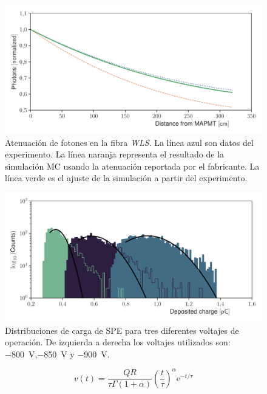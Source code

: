 \begin{figure}
        \centering
        \includegraphics[width=\textwidth]{data_atlength.pdf}
        \caption{Atenuación de fotones en la fibra \emph{WLS}. La línea azul son datos del experimento. La línea naranja representa el resultado de la simulación MC usando la atenuación reportada por el fabricante. La línea verde es el ajuste de la simulación a partir del experimento.}
        \label{fig:atlength}
\end{figure}



\begin{figure}
        \centering
        \includegraphics[width=\textwidth]{mapmt_charge.pdf}
        \caption{Distribuciones de carga de SPE para tres diferentes voltajes de operación. De izquierda a derecha los voltajes utilizados son: \SI{-800}{\volt},\SI{-850}{\volt} y \SI{-900}{\volt}.}
        \label{fig:mapmt_charge}
\end{figure}

\begin{equation}
\label{equ:sphe}
v(t)=\frac{QR}{\tau\Gamma(1+\alpha)}\left(\frac{t}{\tau}\right)^{\alpha}\mathrm{e}^{-t/\tau}
\end{equation}

